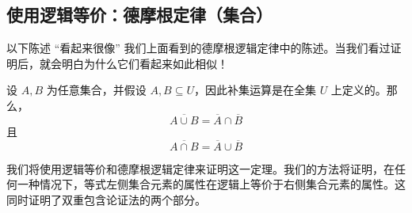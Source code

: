 \subsection{使用逻辑等价：德摩根定律（集合）}\label{sec:section4.6.6}

以下陈述 ``看起来很像'' 我们上面看到的德摩根逻辑定律中的陈述。当我们看过证明后，就会明白为什么它们看起来如此相似！

\begin{theorem}\label{theorem4.6.9}
    设 $A, B$ 为任意集合，并假设 $A, B \subseteq U$，因此补集运算是在全集 $U$ 上定义的。那么，
    \[\overline{A \cup B} = \overline{A} \cap \overline{B}\]
    且
    \[\overline{A \cap B} = \overline{A} \cup \overline{B}\]
\end{theorem}

我们将使用逻辑等价和德摩根逻辑定律来证明这一定理。我们的方法将证明，在任何一种情况下，等式左侧集合元素的属性在逻辑上等价于右侧集合元素的属性。这同时证明了双重包含论证法的两个部分。

